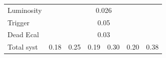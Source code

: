 \documentclass[compress, serif]{beamer}
\begin{document}
{\begin{table}[h!]
\begin{tabular}{ lcccccc }
    Luminosity & \multicolumn{6}{c}{0.026}                                                                      \\ %
    Trigger & \multicolumn{6}{c}{0.05}                                                                       \\ %
    Dead Ecal & \multicolumn{6}{c}{0.03}                                                                       \\ %
    \hline                                                                                                         %
    Total syst & 0.18   & 0.25                & 0.19   & 0.30                    & 0.20 & 0.38                    \\ %
    \hline
    \hline
  \end{tabular}
\end{table}
}
\end{document}
